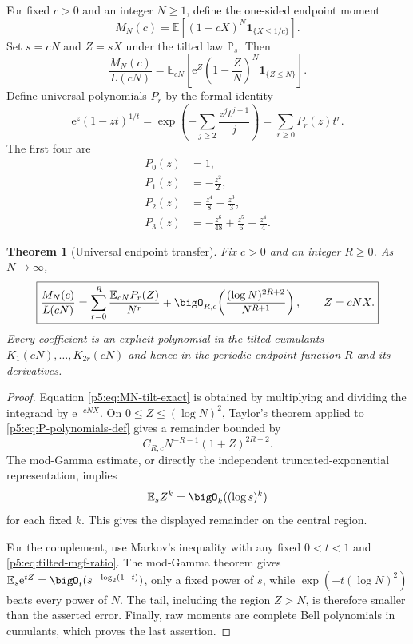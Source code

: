 \documentclass[11pt]{article}
\numberwithin{equation}{section}
\newtheorem{theorem}{Theorem}[section]
\theoremstyle{definition}
\theoremstyle{remark}
\newcommand{\E}{\mathbb E}
\newcommand{\Prob}{\mathbb P}
\newcommand{\e}{\mathrm e}
\begin{document}
For fixed $c>0$ and an integer $N\ge1$, define the one-sided endpoint moment
\begin{equation}\label{p5:eq:MNc}
 M_N(c)=\E\left[(1-cX)^N\bm1_{\{X\le1/c\}}\right].
\end{equation}
Set $s=cN$ and $Z=sX$ under the tilted law $\Prob_s$.  Then
\begin{equation}\label{p5:eq:MN-tilt-exact}
 \frac{M_N(c)}{L(cN)}
 =\E_{cN}\left[\e^Z\left(1-\frac ZN\right)^N
 \bm1_{\{Z\le N\}}\right].
\end{equation}
Define universal polynomials $P_r$ by the formal identity
\begin{equation}\label{p5:eq:P-polynomials-def}
 \e^z(1-zt)^{1/t}
 =\exp\!\left(-\sum_{j\ge2}\frac{z^jt^{j-1}}j\right)
 =\sum_{r\ge0}P_r(z)t^r.
\end{equation}
The first four are
\begin{align}
 P_0(z)&=1,\nonumber\\
 P_1(z)&=-\frac{z^2}{2},\nonumber\\
 P_2(z)&=\frac{z^4}{8}-\frac{z^3}{3},\label{p5:eq:P-first}\\
 P_3(z)&=-\frac{z^6}{48}+\frac{z^5}{6}-\frac{z^4}{4}.\nonumber
\end{align}

\begin{theorem}[Universal endpoint transfer]\label{p5:thm:endpoint-transfer}
Fix $c>0$ and an integer $R\ge0$.  As $N\to\infty$,
\begin{equation}\label{p5:eq:endpoint-transfer}
 \boxed{
 \frac{M_N(c)}{L(cN)}=
 \sum_{r=0}^{R}\frac{\E_{cN}P_r(Z)}{N^r}
 +\bigO_{R,c}\!\left(
 \frac{(\log N)^{2R+2}}{N^{R+1}}\right),
 \qquad Z=cNX.}
\end{equation}
Every coefficient is an explicit polynomial in the tilted cumulants
$K_1(cN),\dots,K_{2r}(cN)$ and hence in the periodic endpoint function $R$ and
its derivatives.
\end{theorem}

\begin{proof}
Equation \cref{p5:eq:MN-tilt-exact} is obtained by multiplying and dividing the
integrand by $\e^{-cNX}$.  On $0\le Z\le(\log N)^2$, Taylor's theorem applied
to \cref{p5:eq:P-polynomials-def} gives a remainder bounded by
\[
 C_{R,c}N^{-R-1}(1+Z)^{2R+2}.
\]
The mod-Gamma estimate, or directly the independent truncated-exponential
representation, implies
\begin{equation}\label{p5:eq:tilted-moment-bound}
 \E_sZ^k=\bigO_k((\log s)^k)
\end{equation}
for each fixed $k$.  This gives the displayed remainder on the central region.

For the complement, use Markov's inequality with any fixed $0<t<1$ and
\cref{p5:eq:tilted-mgf-ratio}.  The mod-Gamma theorem gives
$\E_s\e^{tZ}=\bigO_t(s^{-\log_2(1-t)})$, only a fixed power of $s$, while
$\exp(-t(\log N)^2)$ beats every power of $N$.  The tail, including the region
$Z>N$, is therefore smaller than the asserted error.  Finally, raw moments are
complete Bell polynomials in cumulants, which proves the last assertion.
\end{proof}
\end{document}

